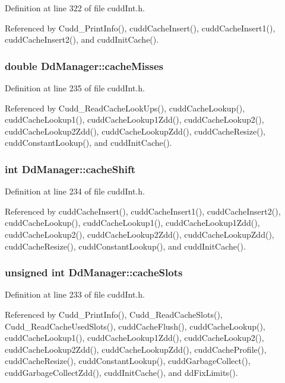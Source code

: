 Definition at line 322 of file cudd\-Int.h.

Referenced by Cudd\_\-Print\-Info(), cudd\-Cache\-Insert(), cudd\-Cache\-Insert1(), cudd\-Cache\-Insert2(), and cudd\-Init\-Cache().
\subsubsection{\setlength{\rightskip}{0pt plus 5cm}double \bf{Dd\-Manager::cache\-Misses}}\label{structDdManager_1ad17eb6e9964ffdd653738c5ead9c30}




Definition at line 235 of file cudd\-Int.h.

Referenced by Cudd\_\-Read\-Cache\-Look\-Ups(), cudd\-Cache\-Lookup(), cudd\-Cache\-Lookup1(), cudd\-Cache\-Lookup1Zdd(), cudd\-Cache\-Lookup2(), cudd\-Cache\-Lookup2Zdd(), cudd\-Cache\-Lookup\-Zdd(), cudd\-Cache\-Resize(), cudd\-Constant\-Lookup(), and cudd\-Init\-Cache().
\subsubsection{\setlength{\rightskip}{0pt plus 5cm}int \bf{Dd\-Manager::cache\-Shift}}\label{structDdManager_37c6c4bc87d6ae814c0cbb178fa9a69a}




Definition at line 234 of file cudd\-Int.h.

Referenced by cudd\-Cache\-Insert(), cudd\-Cache\-Insert1(), cudd\-Cache\-Insert2(), cudd\-Cache\-Lookup(), cudd\-Cache\-Lookup1(), cudd\-Cache\-Lookup1Zdd(), cudd\-Cache\-Lookup2(), cudd\-Cache\-Lookup2Zdd(), cudd\-Cache\-Lookup\-Zdd(), cudd\-Cache\-Resize(), cudd\-Constant\-Lookup(), and cudd\-Init\-Cache().
\subsubsection{\setlength{\rightskip}{0pt plus 5cm}unsigned int \bf{Dd\-Manager::cache\-Slots}}\label{structDdManager_c977e490cd2ff8e2c4a0dc734c1b533b}




Definition at line 233 of file cudd\-Int.h.

Referenced by Cudd\_\-Print\-Info(), Cudd\_\-Read\-Cache\-Slots(), Cudd\_\-Read\-Cache\-Used\-Slots(), cudd\-Cache\-Flush(), cudd\-Cache\-Lookup(), cudd\-Cache\-Lookup1(), cudd\-Cache\-Lookup1Zdd(), cudd\-Cache\-Lookup2(), cudd\-Cache\-Lookup2Zdd(), cudd\-Cache\-Lookup\-Zdd(), cudd\-Cache\-Profile(), cudd\-Cache\-Resize(), cudd\-Constant\-Lookup(), cudd\-Garbage\-Collect(), cudd\-Garbage\-Collect\-Zdd(), cudd\-Init\-Cache(), and dd\-Fix\-Limits().
